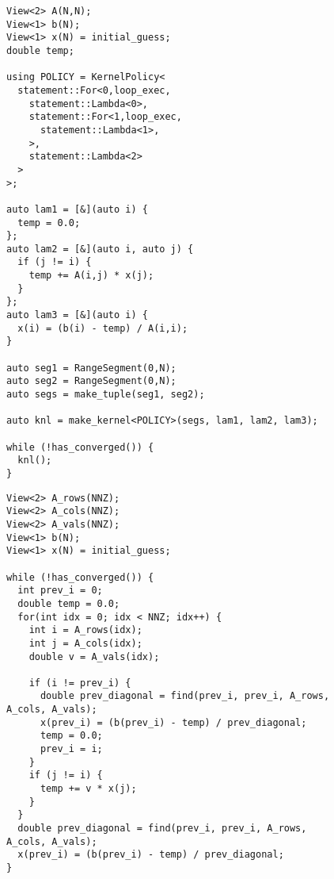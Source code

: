 \begin{figure}
\begin{lstlisting}[caption={\dense{} version of Gauss-Seidel iteration},label=DenseGauSei]
View<2> A(N,N);
View<1> b(N);
View<1> x(N) = initial_guess;
double temp;

using POLICY = KernelPolicy<
  statement::For<0,loop_exec,
    statement::Lambda<0>,
    statement::For<1,loop_exec,
      statement::Lambda<1>,
    >,
    statement::Lambda<2>
  >
>;

auto lam1 = [&](auto i) {
  temp = 0.0;
};
auto lam2 = [&](auto i, auto j) {
  if (j != i) {
    temp += A(i,j) * x(j);
  }
};
auto lam3 = [&](auto i) {
  x(i) = (b(i) - temp) / A(i,i);
}

auto seg1 = RangeSegment(0,N);
auto seg2 = RangeSegment(0,N);
auto segs = make_tuple(seg1, seg2);

auto knl = make_kernel<POLICY>(segs, lam1, lam2, lam3);

while (!has_converged()) {
  knl();
}
\end{lstlisting}
\end{figure}

\begin{figure}
\begin{lstlisting}[caption={\specialized{} version of Gauss-Seidel iteration},label=SpecializedGauSei]
View<2> A_rows(NNZ);
View<2> A_cols(NNZ);
View<2> A_vals(NNZ);
View<1> b(N);
View<1> x(N) = initial_guess;

while (!has_converged()) {
  int prev_i = 0;
  double temp = 0.0;
  for(int idx = 0; idx < NNZ; idx++) {
    int i = A_rows(idx);
    int j = A_cols(idx);
    double v = A_vals(idx);

    if (i != prev_i) {
      double prev_diagonal = find(prev_i, prev_i, A_rows, A_cols, A_vals);
      x(prev_i) = (b(prev_i) - temp) / prev_diagonal;
      temp = 0.0;
      prev_i = i;
    }
    if (j != i) {
      temp += v * x(j);
    } 
  }
  double prev_diagonal = find(prev_i, prev_i, A_rows, A_cols, A_vals);
  x(prev_i) = (b(prev_i) - temp) / prev_diagonal;
}
\end{lstlisting}
\end{figure}



